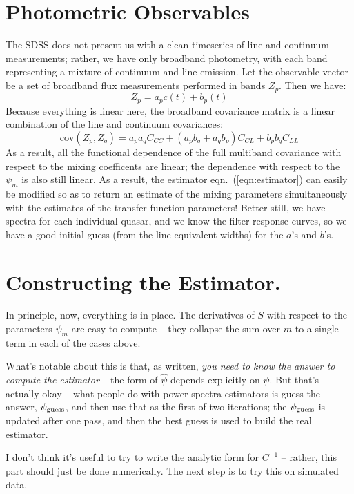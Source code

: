 \documentclass[11pt,a4paper]{article}
\begin{document}
\section{Photometric Observables}
The SDSS does not present us with a clean timeseries of line and
continuum measurements; rather, we have only broadband photometry,
with each band representing a mixture of continuum and line
emission. Let the observable vector be a set of broadband flux
measurements performed in bands $Z_p$. Then we have:
\begin{equation}
  Z_p = a_p c\left(t\right) + b_p \left(t\right)
\end{equation}
Because everything is linear here, the broadband covariance matrix is
a linear combination of the line and continuum covariances:
\begin{equation}
\mathrm{cov}(Z_p,Z_q)= a_pa_qC_{CC}+(a_pb_q +a_qb_p)C_{CL} + b_pb_qC_{LL}
\end{equation}
As a result, all the functional dependence of the full multiband
covariance with respect to the mixing coefficents are linear; the
dependence with respect to the $\psi_m$ is also still linear. As a
result, the estimator eqn.~(\ref{eqn:estimator}) can easily be
modified so as to return an estimate of the mixing parameters
simultaneously with the estimates of the transfer function parameters!
Better still, we have spectra for each individual quasar, and we know
the filter response curves, so we have a good initial guess (from the
line equivalent widths) for the $a$'s and $b$'s.


\section{Constructing the Estimator.}
In principle, now, everything is in place. The derivatives of $S$ with
respect to the parameters $\psi_m$ are easy to compute -- they
collapse the sum over $m$ to a single term in each of the cases
above. 

What's notable about this is that, as written, {\it you need to know
  the answer to compute the estimator} -- the form of $\hat{\psi}$
depends explicitly on $\psi$. But that's actually okay -- what people
do with power spectra estimators is guess the answer, $\psi_{\rm
  guess}$, and then use that as the first of two iterations; the
$\psi_{\rm guess}$ is updated after one pass, and then the best guess
is used to build the real estimator.

I don't think it's useful to try to write the analytic form for
$C^{-1}$ -- rather, this part should just be done numerically. The
next step is to try this on simulated data.
\end{document}
